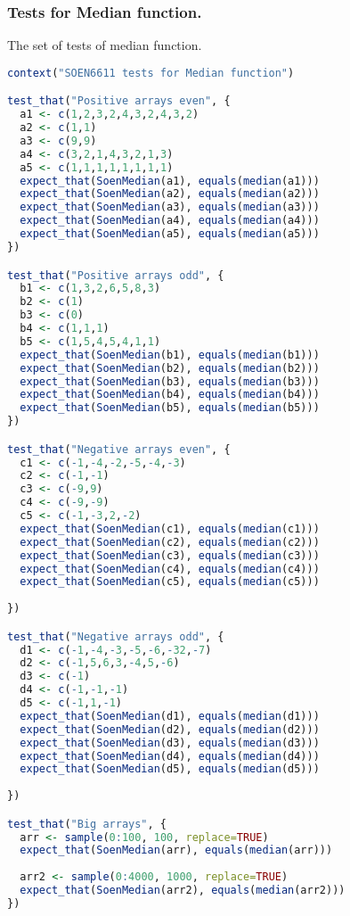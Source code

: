 \documentclass[12pt]{article}
\begin{document}
\subsubsection{Tests for Median function.}
The set of tests of median function.
\begin{lstlisting}[language=R]
context("SOEN6611 tests for Median function")

test_that("Positive arrays even", {
  a1 <- c(1,2,3,2,4,3,2,4,3,2)
  a2 <- c(1,1)
  a3 <- c(9,9)
  a4 <- c(3,2,1,4,3,2,1,3)
  a5 <- c(1,1,1,1,1,1,1,1)
  expect_that(SoenMedian(a1), equals(median(a1)))
  expect_that(SoenMedian(a2), equals(median(a2)))
  expect_that(SoenMedian(a3), equals(median(a3)))
  expect_that(SoenMedian(a4), equals(median(a4)))
  expect_that(SoenMedian(a5), equals(median(a5)))
})

test_that("Positive arrays odd", {
  b1 <- c(1,3,2,6,5,8,3)
  b2 <- c(1)
  b3 <- c(0)
  b4 <- c(1,1,1)
  b5 <- c(1,5,4,5,4,1,1)
  expect_that(SoenMedian(b1), equals(median(b1)))
  expect_that(SoenMedian(b2), equals(median(b2)))
  expect_that(SoenMedian(b3), equals(median(b3)))
  expect_that(SoenMedian(b4), equals(median(b4)))
  expect_that(SoenMedian(b5), equals(median(b5)))
})

test_that("Negative arrays even", {
  c1 <- c(-1,-4,-2,-5,-4,-3)
  c2 <- c(-1,-1)
  c3 <- c(-9,9)
  c4 <- c(-9,-9)
  c5 <- c(-1,-3,2,-2)
  expect_that(SoenMedian(c1), equals(median(c1)))
  expect_that(SoenMedian(c2), equals(median(c2)))
  expect_that(SoenMedian(c3), equals(median(c3)))
  expect_that(SoenMedian(c4), equals(median(c4)))
  expect_that(SoenMedian(c5), equals(median(c5)))
  
})

test_that("Negative arrays odd", {
  d1 <- c(-1,-4,-3,-5,-6,-32,-7)
  d2 <- c(-1,5,6,3,-4,5,-6)
  d3 <- c(-1)
  d4 <- c(-1,-1,-1)
  d5 <- c(-1,1,-1)
  expect_that(SoenMedian(d1), equals(median(d1)))
  expect_that(SoenMedian(d2), equals(median(d2)))
  expect_that(SoenMedian(d3), equals(median(d3)))
  expect_that(SoenMedian(d4), equals(median(d4)))
  expect_that(SoenMedian(d5), equals(median(d5)))
  
})

test_that("Big arrays", {
  arr <- sample(0:100, 100, replace=TRUE)
  expect_that(SoenMedian(arr), equals(median(arr)))
  
  arr2 <- sample(0:4000, 1000, replace=TRUE)
  expect_that(SoenMedian(arr2), equals(median(arr2)))
})
\end{lstlisting}
\end{document}
